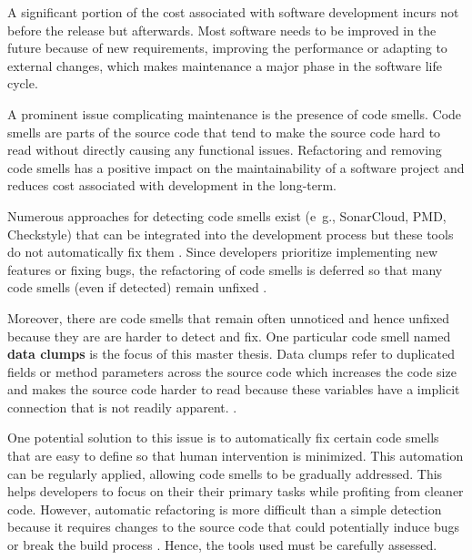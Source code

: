 \label{sec:introduction}

A significant portion of the cost associated with software development incurs not before the release but afterwards. Most software needs to be improved in the future because of new requirements, improving the performance or adapting to external changes, which makes maintenance a major phase in the  software life cycle.


A prominent issue  complicating maintenance is the presence of code smells. Code smells are parts of the source code that tend to make the source code hard to read without directly causing any functional issues. Refactoring and removing code smells has a positive impact on the maintainability  of a software project and reduces cost associated with development in the long-term.\cite{mealyEvaluatingSoftwareRefactoring2006}



Numerous approaches for detecting code smells exist (e~g., SonarCloud,  PMD, Checkstyle) that can be integrated into the development process but these tools do not automatically fix them  \cite{vidalApproachPrioritizeCode2016}. Since developers prioritize implementing new features or fixing bugs, the refactoring of code smells is deferred so that many code smells (even if detected) remain unfixed   \cite{10.1145/2393596.2393655}.

Moreover, there are code smells that remain often unnoticed and hence unfixed because they are are harder to detect and fix. One particular code smell named \textbf{data clumps} is the focus of this master thesis. Data clumps refer to duplicated fields or method parameters across the source code which increases the code size and makes the source code harder to read because these variables have a implicit connection that is not readily apparent.  \cite{BaumgartnerAP23}  \cite{data_clumps_refactoring_guru} \cite{join_data_items}.
 



One potential solution to this issue is to automatically fix certain code smells that are easy to define so that human intervention is minimized. This automation can be regularly applied, allowing code smells to be gradually addressed. This helps developers to focus on their their primary tasks while profiting from cleaner code. 
However,  automatic refactoring  is more difficult than a simple detection because it requires changes to the source code that could potentially induce bugs or break the build process \cite{9796303}. Hence, the tools used must be carefully assessed. 


